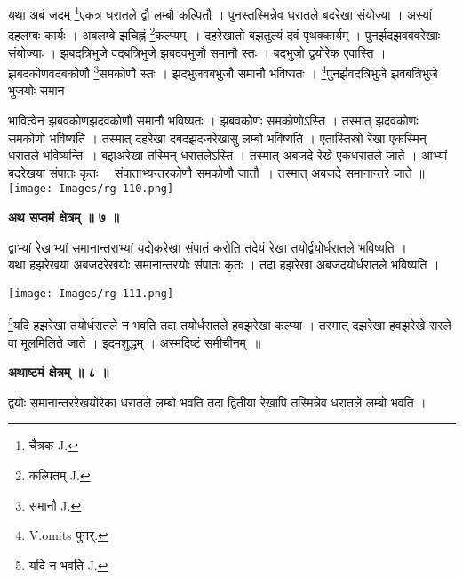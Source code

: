 \documentclass[11pt, openany]{book}
\begin{document}
यथा अबं जदम् \renewcommand{\thefootnote}{१}\footnote{चैत्रक {\en J.}}एकत्र धरातले द्वौ लम्बौ कल्पितौ । पुनस्तस्मिन्नेव धरातले बदरेखा संयोज्या । अस्यां दहलम्बः कार्यः । अबलम्बे झचिह्नं \renewcommand{\thefootnote}{२}\footnote{कल्पितम् {\en J.}}कल्प्यम्~। दहरेखातो बझतुल्यं दवं पृथक्कार्यम्  । पुनर्झदझवबवरेखाः संयोज्याः  । झबदत्रिभुजे वदबत्रिभुजे झबदवभुजौ समानौ स्तः । बदभुजो द्वयोरेक एवास्ति  । झबदकोणवदबकोणौ \renewcommand{\thefootnote}{३}\footnote{समानौ {\en J.}}समकोणौ स्तः । झदभुजवबभुजौ समानौ भविष्यतः  । \renewcommand{\thefootnote}{४}\footnote{{\en V.omits} पुनर्.}पुनर्झवदत्रिभुजे झवबत्रिभुजे भुजयोः समान-
\begin{vwcol}[widths={0.65,0.35}, sep=.8cm, rule=0pt] 
भावित्वेन झबवकोणझदवकोणौ
समानौ भविष्यतः । झबवकोणः समकोणोऽस्ति । तस्मात् झदवकोणः
समकोणो भविष्यति  । तस्मात् दहरेखा दबदझदजरेखासु लम्बो भविष्यति । एतास्तिस्रो रेखा एकस्मिन् धरातले भविष्यन्ति~। बझअरेखा तस्मिन् धरातलेऽस्ति । तस्मात् अबजदे रेखे एकधरातले जाते । आभ्यां बदरेखया संपातः कृतः । संपाताभ्यन्तरकोणौ समकोणौ जातौ~। तस्मात् अबजदे समानान्तरे जाते ॥\\
\noindent \texttt{[image: Images/rg-110.png]}
\end{vwcol}

\begin{center}
\textbf{\large अथ सप्तमं क्षेत्रम् ॥ ७ ॥}
\end{center}

{\ab द्वाभ्यां रेखाभ्यां समानान्तराभ्यां यद्येकरेखा संपातं करोति तदेयं रेखा तयोर्द्वयोर्धरातले भविष्यति  ।}\\

यथा हझरेखया अबजदरेखयोः समानान्तरयोः संपातः कृतः ।
तदा हझरेखा अबजदयोर्धरातले भविष्यति ।\\
\begin{center}
\noindent \texttt{[image: Images/rg-111.png]}
\end{center}
\renewcommand{\thefootnote}{५}\footnote{यदि न भवति {\en J.}}यदि हझरेखा तयोर्धरातले न भवति तदा तयोर्धरातले हवझरेखा कल्प्या ।
तस्मात् दझरेखा हवझरेखे सरले वा मूलमिलिते जाते  । इदमशुद्धम्  । अस्मदिष्टं समीचीनम्~॥

\newpage
\begin{center}
\textbf{\large अथाष्टमं क्षेत्रम् ॥ ८ ॥}
\end{center}

{\ab द्वयोः समानान्तररेखयोरेका धरातले लम्बो भवति तदा
द्वितीया रेखापि तस्मिन्नेव धरातले लम्बो भवति  ।}\\
\end{document}
